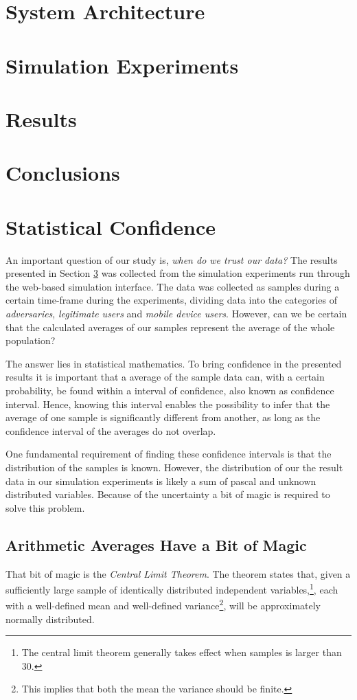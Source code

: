\documentclass[a4paper,11pt]{kth-mag}
\begin{document}
\section{System Architecture}

\section{Simulation Experiments}

\section{Results}\label{result}

\section{Conclusions}
 
\removepagenumbers
\appendix 
\appendixpage

 
\section{Statistical Confidence}\label{tab:confidence}
An important question of our study is, \emph{when do we trust our data?} The results presented in Section \ref{result} was collected from the simulation experiments run through the web-based simulation interface. The data was collected as samples during a certain time-frame during the experiments, dividing data into the categories of \emph{adversaries}, \emph{legitimate users} and \emph{mobile device users}. However,  can we be certain that the calculated averages of our samples represent the average of the whole population?

The answer lies in statistical mathematics. To bring confidence in the presented results it is important that a average of the sample data can, with a certain probability, be found within a interval of confidence, also known as confidence interval. Hence, knowing this interval enables the possibility to infer that the average of one sample is significantly different from another, as long as the confidence interval of the averages do not overlap.

One fundamental requirement of finding these confidence intervals is that the distribution of the samples is known. However, the distribution of our the result data in our simulation experiments is likely a sum of pascal and unknown distributed variables. Because of the uncertainty a bit of magic is required to solve this problem. 

\subsection{Arithmetic Averages Have a Bit of Magic}
That bit of magic is the \emph{Central Limit Theorem}. The theorem states that, given a sufficiently large sample of identically distributed independent variables,\footnote{The central limit theorem generally takes effect when samples is larger than 30.}, each with a well-defined mean and well-defined variance\footnote{This implies that both the mean the variance should be finite.}, will be approximately normally distributed\cite{gunnar}.
\end{document}
